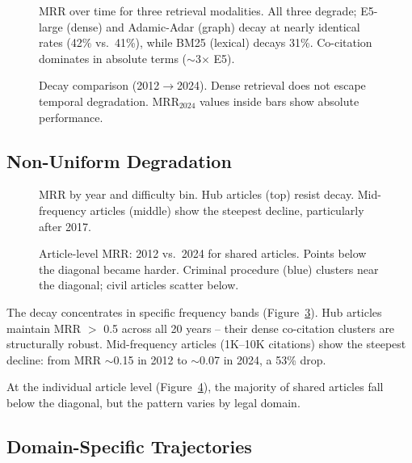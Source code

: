 \documentclass[11pt]{article}
\begin{document}
\begin{figure}[t]
\centering

\caption{MRR over time for three retrieval modalities. All three degrade; E5-large (dense) and Adamic-Adar (graph) decay at nearly identical rates (42\% vs.\ 41\%), while BM25 (lexical) decays 31\%. Co-citation dominates in absolute terms ($\sim$3$\times$ E5).}
\label{fig:e5_temporal}
\end{figure}

\begin{figure}[t]
\centering

\caption{Decay comparison (2012$\to$2024). Dense retrieval does not escape temporal degradation. MRR$_{2024}$ values inside bars show absolute performance.}
\label{fig:decay_comparison}
\end{figure}

\subsection{Non-Uniform Degradation}

\begin{figure}[t]
\centering

\caption{MRR by year and difficulty bin. Hub articles (top) resist decay. Mid-frequency articles (middle) show the steepest decline, particularly after 2017.}
\label{fig:heatmap_temporal}
\end{figure}

\begin{figure}[t]
\centering

\caption{Article-level MRR: 2012 vs.\ 2024 for shared articles. Points below the diagonal became harder. Criminal procedure (blue) clusters near the diagonal; civil articles scatter below.}
\label{fig:stability}
\end{figure}

The decay concentrates in specific frequency bands (Figure~\ref{fig:heatmap_temporal}).
Hub articles maintain MRR $>$ 0.5 across all 20 years -- their dense co-citation clusters are structurally robust.
Mid-frequency articles (1K--10K citations) show the steepest decline: from MRR $\sim$0.15 in 2012 to $\sim$0.07 in 2024, a 53\% drop.

At the individual article level (Figure~\ref{fig:stability}), the majority of shared articles fall below the diagonal, but the pattern varies by legal domain.

\subsection{Domain-Specific Trajectories}
\end{document}

